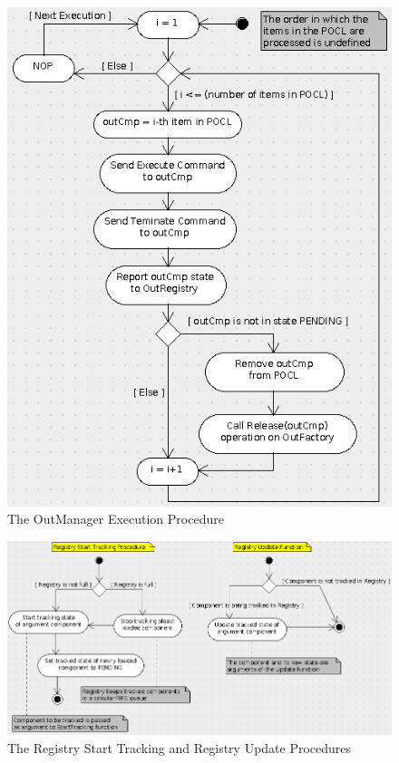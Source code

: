 \documentclass[a4paper,10pt]{article}
\begin{document}
\begin{figure}[h]
 \centering
 \includegraphics[scale=0.40,keepaspectratio=true]{OutManagerExecution.png}
 \caption{The OutManager Execution Procedure}
 \label{fig:OutManagerExecution}
\end{figure}

\begin{figure}[h]
 \centering
 \includegraphics[scale=0.40,keepaspectratio=true]{RegistryStartTrackingAndUpdate.png}
 \caption{The Registry Start Tracking and Registry Update Procedures}
 \label{fig:RegistryStartTrackingAndUpdate}
\end{figure}
\end{document}
